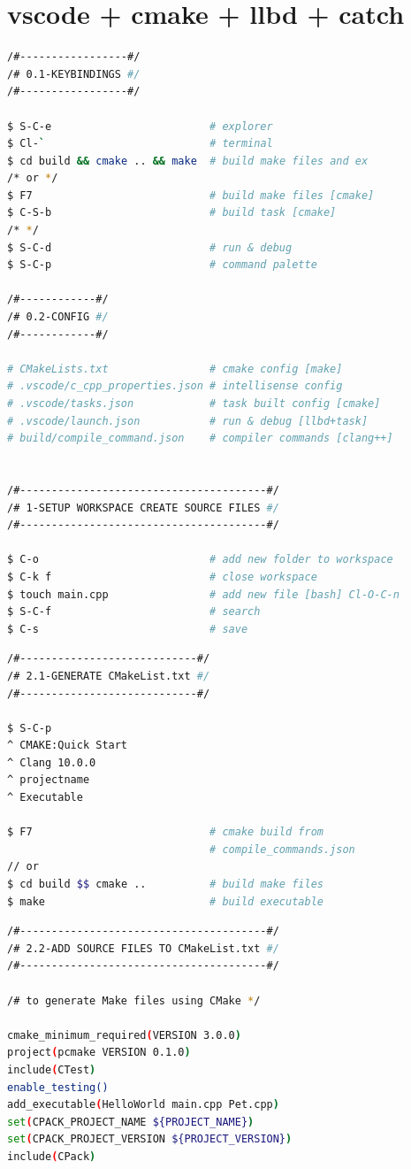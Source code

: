 \documentclass[8pt]{extarticle}
\begin{document}
\begin{small}
\begin{multicols}{2}
\begin{lstlisting}[language=C]
\end{lstlisting}

\section*{vscode + cmake + llbd + catch}

\begin{lstlisting}[language=bash]
/#-----------------#/
/# 0.1-KEYBINDINGS #/
/#-----------------#/

$ S-C-e							# explorer
$ Cl-`							# terminal
$ cd build && cmake .. && make	# build make files and ex
/* or */
$ F7							# build make files [cmake]
$ C-S-b							# build task [cmake]
/* */
$ S-C-d							# run & debug
$ S-C-p							# command palette

/#------------#/
/# 0.2-CONFIG #/
/#------------#/

# CMakeLists.txt				# cmake config [make]
# .vscode/c_cpp_properties.json	# intellisense config
# .vscode/tasks.json			# task built config [cmake] 
# .vscode/launch.json			# run & debug [llbd+task]
# build/compile_command.json  	# compiler commands [clang++]


/#---------------------------------------#/
/# 1-SETUP WORKSPACE CREATE SOURCE FILES #/
/#---------------------------------------#/

$ C-o							# add new folder to workspace
$ C-k f							# close workspace	
$ touch main.cpp				# add new file [bash] Cl-O-C-n
$ S-C-f							# search
$ C-s							# save
\end{lstlisting}

\begin{lstlisting}[language=bash]
/#----------------------------#/
/# 2.1-GENERATE CMakeList.txt #/
/#----------------------------#/

$ S-C-p
^ CMAKE:Quick Start
^ Clang 10.0.0
^ projectname
^ Executable

$ F7							# cmake build from 
								# compile_commands.json
// or
$ cd build $$ cmake	..			# build make files
$ make							# build executable


\end{lstlisting}

\begin{lstlisting}[language=bash]
/#---------------------------------------#/
/# 2.2-ADD SOURCE FILES TO CMakeList.txt #/
/#---------------------------------------#/

/# to generate Make files using CMake */

cmake_minimum_required(VERSION 3.0.0)
project(pcmake VERSION 0.1.0)
include(CTest)
enable_testing()
add_executable(HelloWorld main.cpp Pet.cpp)
set(CPACK_PROJECT_NAME ${PROJECT_NAME})
set(CPACK_PROJECT_VERSION ${PROJECT_VERSION})
include(CPack)
\end{lstlisting}


\end{multicols}
\end{small}
\end{document}
